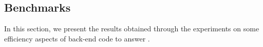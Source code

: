 \subsection{Benchmarks}
\label{subsec:exp3}
In this section, we present the results obtained through the experiments on some efficiency aspects of back-end code to answer . 

